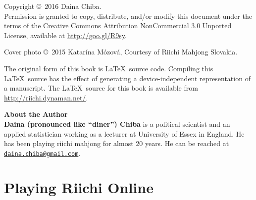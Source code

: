 \documentclass{book}
\begin{document}
\pagebreak

\pagebreak
\thispagestyle{empty}

\noindent
{\small
Copyright \copyright ~2016 Daina Chiba.\\
Permission is granted to copy, distribute, and/or modify this document
under the terms of the Creative Commons Attribution NonCommercial 3.0 Unported License, available at \url{http://goo.gl/R9sy}.

\vspace{.2in}
\noindent
Cover photo \copyright ~2015 Katar\'{i}na M\'{o}zov\'{a}, Courtesy of Riichi Mahjong Slovakia. 

\vspace{.2in}

\noindent
The original form of this book is \LaTeX\ source code.  Compiling this
\LaTeX\ source has the effect of generating a device-independent
representation of a manuscript. The \LaTeX\ source for this book is available from 
\url{http://riichi.dynaman.net/}.

\vfill
\noindent
{\large\bf About the Author}\\

\noindent
{\bf Daina (pronounced like ``diner'') Chiba} is a political scientist and an applied statistician working as a lecturer at University of Essex in England. 
He has been playing riichi mahjong for almost 20 years. 
He can be reached at \href{mailto:daina.chiba@gmail.com}{\tt daina.chiba@gmail.com}.
} %


\pagebreak

\let\cleardoublepage\clearpage




{
	\tableofcontents
}

\newpage

\mainmatter


\part{Playing Riichi Online} \label{part:online}



\end{document}

